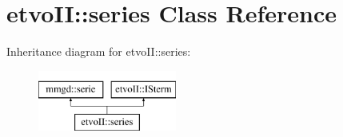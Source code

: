 \hypertarget{classetvo_i_i_1_1series}{}\section{etvo\+II\+:\+:series Class Reference}
\label{classetvo_i_i_1_1series}
Inheritance diagram for etvo\+II\+:\+:series\+:\begin{figure}[H]
\begin{center}
\leavevmode
\includegraphics[height=2.000000cm]{classetvo_i_i_1_1series}
\end{center}
\end{figure}
